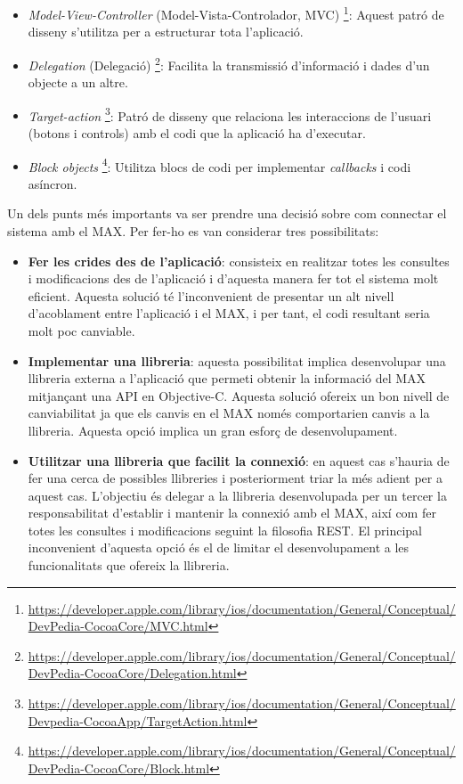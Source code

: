 \begin{itemize}
    \item \textit{Model-View-Controller} (Model-Vista-Controlador, MVC) \footnote{\url{https://developer.apple.com/library/ios/documentation/General/Conceptual/DevPedia-CocoaCore/MVC.html}}: Aquest patró de disseny s'utilitza per a estructurar tota l'aplicació.
    \item \textit{Delegation} (Delegació) \footnote{\url{https://developer.apple.com/library/ios/documentation/General/Conceptual/DevPedia-CocoaCore/Delegation.html}}: Facilita la transmissió d'informació i dades d'un objecte a un altre.
    \item \textit{Target-action} \footnote{\url{https://developer.apple.com/library/ios/documentation/General/Conceptual/Devpedia-CocoaApp/TargetAction.html}}: Patró de disseny que relaciona les interaccions de l'usuari (botons i controls) amb el codi que la aplicació ha d'executar.
    \item \textit{Block objects} \footnote{\url{https://developer.apple.com/library/ios/documentation/General/Conceptual/DevPedia-CocoaCore/Block.html}}: Utilitza blocs de codi per implementar \textit{callbacks} i codi asíncron.
\end{itemize}

Un dels punts més importants va ser prendre una decisió sobre com connectar el sistema amb el MAX. Per fer-ho es van considerar tres possibilitats:
\begin{itemize}
    \item  \textbf{Fer les crides des de l'aplicació}: consisteix en realitzar totes les consultes i modificacions des de l'aplicació i d'aquesta manera fer tot el sistema molt eficient. Aquesta solució té l'inconvenient de presentar un alt nivell d'acoblament entre l'aplicació i el MAX, i per tant, el codi resultant seria molt poc canviable.
    \item  \textbf{Implementar una llibreria}: aquesta possibilitat implica desenvolupar una llibreria externa a l'aplicació que permeti obtenir la informació del MAX mitjançant una API en Objective-C. Aquesta solució ofereix un bon nivell de canviabilitat ja que els canvis en el MAX només comportarien canvis a la llibreria. Aquesta opció implica un gran esforç de desenvolupament.
    \item  \textbf{Utilitzar una llibreria que facilit la connexió}: en aquest cas s'hauria de fer una cerca de possibles llibreries i posteriorment triar la més adient per a aquest cas. L'objectiu és delegar a la llibreria desenvolupada per un tercer la responsabilitat d'establir i mantenir la connexió amb el MAX, així com fer totes les consultes i modificacions seguint la filosofia REST. El principal inconvenient d'aquesta opció és el de limitar el desenvolupament a les funcionalitats que ofereix la llibreria.
\end{itemize}

